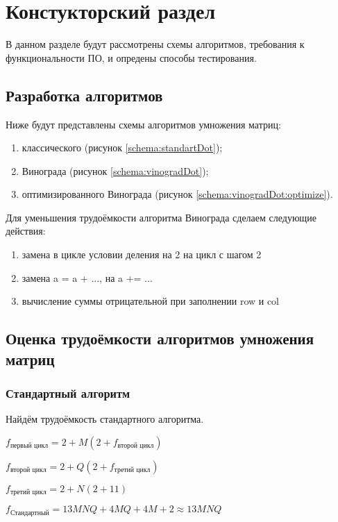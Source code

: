 \chapter{ Констукторский раздел}
\label{cha:design}
    В данном разделе будут рассмотрены схемы алгоритмов, требования к функциональности ПО,
    и опредены способы тестирования.
    
    \section{Разработка алгоритмов}
        Ниже будут представлены схемы алгоритмов умножения матриц: \begin{enumerate}
            \item классического (рисунок \ref{schema:standartDot});
            \item Винограда (рисунок \ref{schema:vinogradDot});
            \item оптимизированного Винограда (рисунок \ref{schema:vinogradDot:optimize}).
        \end{enumerate}

    Для уменьшения трудоёмкости алгоритма Винограда сделаем следующие действия:
    \begin{enumerate}
        \item замена в цикле условии деления на 2 на цикл с шагом 2
        \item замена a = a + ..., на a += ...
        \item вычисление суммы отрицательной при заполнении row и col 
    \end{enumerate}

\section{Оценка трудоёмкости алгоритмов умножения матриц}

  \subsection{Стандартный алгоритм}
            Найдём трудоёмкость стандартного алгоритма.
            
            $ f_\text{первый цикл} = 2 + M(2 + f_\text{второй цикл})$  

            $ f_\text{второй цикл} = 2 + Q(2 + f_\text{третий цикл})$  

            $ f_\text{третий цикл} = 2 + N(2 + 11)$  

            $ f_\text{Стандартный} = 13MNQ + 4MQ + 4M + 2 \approx 13MNQ$

